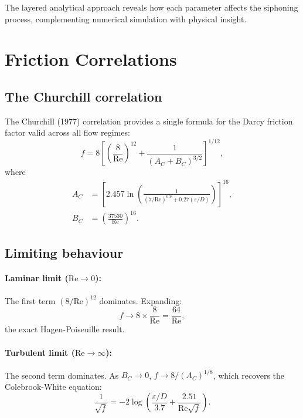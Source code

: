 \documentclass[11pt]{article}
\begin{document}
The layered analytical approach reveals how each parameter affects the siphoning process, complementing numerical simulation with physical insight.

\appendix
\section{Friction Correlations}
\label{app:friction}

\subsection{The Churchill correlation}

The Churchill (1977) correlation provides a single formula for the Darcy friction factor valid across all flow regimes:
\begin{equation}
  f = 8\left[\left(\frac{8}{\text{Re}}\right)^{12} + \frac{1}{(A_C + B_C)^{3/2}}\right]^{1/12},
  \label{eq:churchill-full}
\end{equation}
where
\begin{align}
  A_C &= \left[2.457\ln\left(\frac{1}{(7/\text{Re})^{0.9} + 0.27(\varepsilon/D)}\right)\right]^{16}, \\
  B_C &= \left(\frac{37530}{\text{Re}}\right)^{16}.
\end{align}

\subsection{Limiting behaviour}

\paragraph{Laminar limit ($\text{Re} \to 0$):}
The first term $(8/\text{Re})^{12}$ dominates. Expanding:
\[
  f \to 8 \times \frac{8}{\text{Re}} = \frac{64}{\text{Re}},
\]
the exact Hagen-Poiseuille result.

\paragraph{Turbulent limit ($\text{Re} \to \infty$):}
The second term dominates. As $B_C \to 0$, $f \to 8/(A_C)^{1/8}$, which recovers the Colebrook-White equation:
\[
  \frac{1}{\sqrt{f}} = -2\log\left(\frac{\varepsilon/D}{3.7} + \frac{2.51}{\text{Re}\sqrt{f}}\right).
\]
\end{document}
